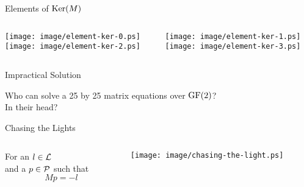 \begin{frame}{Elements of $\operatorname{Ker}(M)$}
	\begin{columns}[T]
		\begin{column}{0.45\textwidth}
			\begin{center}
				\texttt{[image: image/element-ker-0.ps]}\\
				\bigskip
				\texttt{[image: image/element-ker-2.ps]}\\
			\end{center}
		\end{column}
		\begin{column}{0.45\textwidth}
			\begin{center}
				\texttt{[image: image/element-ker-1.ps]}\\
				\bigskip
				\texttt{[image: image/element-ker-3.ps]}\\
			\end{center}
		\end{column}
	\end{columns}
\end{frame}

\begin{frame}{Impractical Solution}
	\begin{center}
		Who can solve a 25 by 25 matrix equations over $\operatorname{GF}(2)$?\\%
		\pause%
		In their head?\\%
	\end{center}
\end{frame}

\begin{frame}{Chasing the Lights}
	\begin{columns}[T]
		\begin{column}{0.45\textwidth}
			For an $l \in \mathcal{L}$\\
			and a $p \in \mathcal{P}$ such that\\
			\[
				Mp = -l
			\]
			\bigskip
			
		\end{column}
		\begin{column}{0.45\textwidth}
			\centerline{\texttt{[image: image/chasing-the-light.ps]}}
		\end{column}
	\end{columns}
\end{frame}

